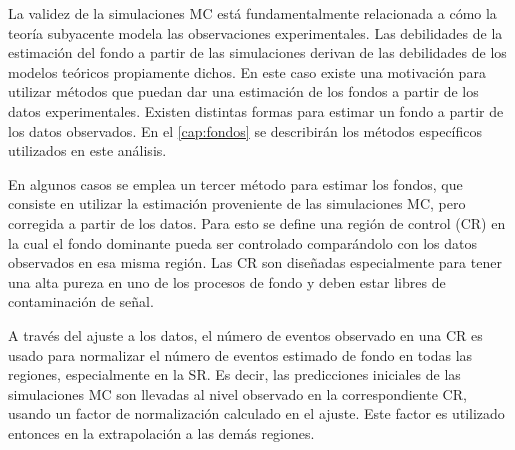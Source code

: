 




La validez de la simulaciones MC está fundamentalmente relacionada a cómo la
teoría subyacente modela las observaciones experimentales. Las debilidades de la
estimación del fondo a partir de las simulaciones derivan de las debilidades de
los modelos teóricos propiamente dichos. En este caso existe una motivación para
utilizar métodos que puedan dar una estimación de los fondos a partir de los
datos experimentales. Existen distintas formas para estimar un fondo a partir de
los datos observados. En el \cref{cap:fondos} se describirán los métodos
específicos utilizados en este análisis.

En algunos casos se emplea un tercer método para estimar los fondos, que consiste en
utilizar la estimación proveniente de las simulaciones MC, pero corregida
a partir de los datos. Para esto se define una región de control (CR) en
la cual el fondo dominante pueda ser controlado comparándolo con los datos
observados en esa misma región. Las CR son diseñadas especialmente para tener
una alta pureza en uno de los procesos de fondo y deben estar libres de
contaminación de señal.

A través del ajuste a los datos, el número de eventos observado en una CR es
usado para normalizar el número de eventos estimado de fondo en todas las
regiones, especialmente en la SR. Es decir, las predicciones iniciales de las
simulaciones MC son llevadas al nivel observado en la correspondiente CR,
usando un factor de normalización calculado en el ajuste. Este factor es
utilizado entonces en la extrapolación a las demás regiones.

